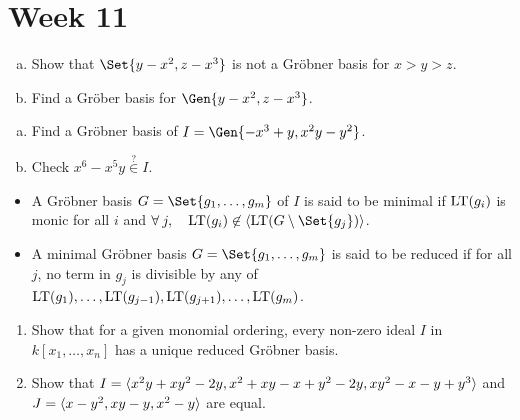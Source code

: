 
\section{Week 11}

\begin{exercise} \mbox{}
  \begin{enumerate}[(a)]
    \item Show that $\Set{ y-x^2, z-x^3 }$ is not a Gr\"obner basis for $x>y>z$.
    \item Find a Gr\"ober basis for $\Gen{ y-x^2, z-x^3 }$.
  \end{enumerate}
\end{exercise}

\begin{exercise} \mbox{}
  \begin{enumerate}[(a)]
    \item Find a Gr\"obner basis of $I = \Gen{ -x^3+y, x^2y - y^2 }$.
    \item Check $x^6 - x^5y \overset{?}{\in} I$.
  \end{enumerate}
\end{exercise}

\begin{definition} \mbox{}
  \begin{itemize}
    \item A Gr\"obner basis $G = \Set{g_1, \dots, g_m}$ of $I$ is said to be
      minimal if $\operatorname{LT}(g_i)$ is monic for all $i$ and $\forall j, \quad
      \LT(g_i) \not\in \gen{\LT(G \setminus\Set{g_j})}$.
    \item A minimal Gr\"obner basis $G = \Set{g_1, \dots, g_m}$ is said to be
      reduced if for all $j$, no term in $g_j$ is divisible by any of
      $\operatorname{LT}(g_1), \dots, \operatorname{LT}(g_{j-1}), \operatorname{LT}(g_{j+1}), \dots, \operatorname{LT}(g_m)$.
  \end{itemize}
\end{definition}

\begin{exercise} \mbox{}
  \begin{enumerate}
    \item Show that for a given monomial ordering, every non-zero ideal $I$ in
      $k[x_1, \dots, x_n]$ has a unique reduced Gr\"obner basis.
    \item Show that $I = \langle x^2y+xy^2-2y, x^2+xy-x+y^2-2y, xy^2-x-y+y^3\rangle$
      and $J = \langle x-y^2, xy-y, x^2-y\rangle$ are equal.
  \end{enumerate}
\end{exercise}

